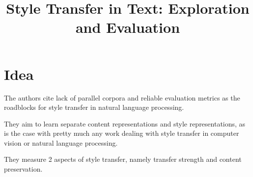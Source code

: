 \documentclass[12pt]{article}
\begin{document}
\title{Style Transfer in Text: Exploration and Evaluation}
\author{}
\date{}
\maketitle

\section{Idea}
The authors cite lack of parallel corpora and reliable evaluation metrics as the roadblocks for style transfer in natural language processing.

They aim to learn separate content representations and style representations, as is the case with pretty much any work dealing with style transfer in computer vision or natural language processing.

They measure 2 aspects of style transfer, namely transfer strength and content preservation.
\end{document}
